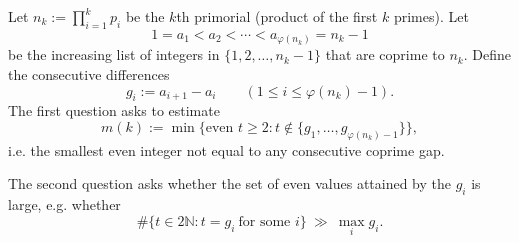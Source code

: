 Let $n_k := \prod_{i=1}^k p_i$ be the $k$th primorial (product of the first $k$ primes). Let
\[
  1=a_1<a_2<\cdots<a_{\varphi(n_k)}=n_k-1
\]
be the increasing list of integers in $\{1,2,\dots,n_k-1\}$ that are coprime to $n_k$.
Define the consecutive differences
\[
  g_i := a_{i+1}-a_i \qquad (1\le i\le \varphi(n_k)-1).
\]
The first question asks to estimate
\[
  m(k):=\min\{\text{even }t\ge 2: t\notin\{g_1,\dots,g_{\varphi(n_k)-1}\}\},
\]
i.e. the smallest even integer not equal to any consecutive coprime gap.

The second question asks whether the set of even values attained by the $g_i$ is large, e.g. whether
\[
  \#\{t\in 2\mathbb{N}: t=g_i\ \text{for some }i\}\ \gg\ \max_i g_i.
\]
